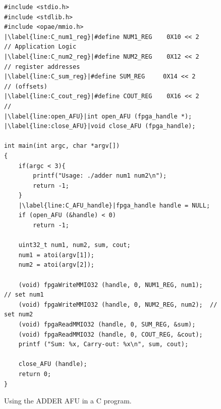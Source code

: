 \documentclass[11pt, twoside, pdftex]{article}
\begin{document}
 \lstset{language=C,numbers=left,escapechar=|}
\begin{figure}[H]
\begin{center}
\begin{minipage}[h]{15 cm}
\begin{lstlisting}[name=C_code]
#include <stdio.h>
#include <stdlib.h>
#include <opae/mmio.h>
|\label{line:C_num1_reg}|#define NUM1_REG    0X10 << 2       // Application Logic
|\label{line:C_num2_reg}|#define NUM2_REG    0X12 << 2       // register addresses
|\label{line:C_sum_reg}|#define SUM_REG     0X14 << 2       // (offsets)
|\label{line:C_cout_reg}|#define COUT_REG    0X16 << 2       // 
|\label{line:open_AFU}|int open_AFU (fpga_handle *);
|\label{line:close_AFU}|void close_AFU (fpga_handle);

int main(int argc, char *argv[])
{
    if(argc < 3){
        printf("Usage: ./adder num1 num2\n");
        return -1;
    }
    |\label{line:C_AFU_handle}|fpga_handle handle = NULL;
    if (open_AFU (&handle) < 0)
        return -1;

    uint32_t num1, num2, sum, cout;
    num1 = atoi(argv[1]);
    num2 = atoi(argv[2]);

    (void) fpgaWriteMMIO32 (handle, 0, NUM1_REG, num1);   // set num1
    (void) fpgaWriteMMIO32 (handle, 0, NUM2_REG, num2);  // set num2
    (void) fpgaReadMMIO32 (handle, 0, SUM_REG, &sum);
    (void) fpgaReadMMIO32 (handle, 0, COUT_REG, &cout);
    printf ("Sum: %x, Carry-out: %x\n", sum, cout);

    close_AFU (handle);
    return 0;
}
\end{lstlisting}
\end{minipage}
\caption{Using the ADDER AFU in a C program.}
\label{fig:adder_code}
\end{center}
\end{figure}
 
\end{document}

